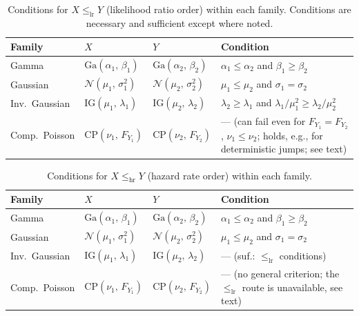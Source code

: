 \documentclass[11pt,a4paper]{article}
\theoremstyle{plain}
\theoremstyle{definition}
\theoremstyle{remark}
\begin{document}
\begin{table}[htbp]
\centering
\caption{Conditions for $X \le_{\mathrm{lr}} Y$ (likelihood ratio order) within each family.  Conditions are necessary and sufficient except where noted.}
\label{tab:ordering_lr}
\small
\begin{tabular}{@{}p{2.1cm}p{3.8cm}p{4.0cm}p{4.0cm}@{}}
\toprule
\textbf{Family} & $X$ & $Y$ & \textbf{Condition} \\
\midrule
Gamma
  & $\mathrm{Ga}(\alpha_1,\,\beta_1)$
  & $\mathrm{Ga}(\alpha_2,\,\beta_2)$
  & $\alpha_1 \le \alpha_2$ and $\beta_1 \ge \beta_2$ \\[4pt]
Gaussian
  & $\mathcal{N}(\mu_1,\,\sigma_1^2)$
  & $\mathcal{N}(\mu_2,\,\sigma_2^2)$
  & $\mu_1 \le \mu_2$ and $\sigma_1 = \sigma_2$ \\[4pt]
Inv.\ Gaussian
  & $\mathrm{IG}(\mu_1,\,\lambda_1)$
  & $\mathrm{IG}(\mu_2,\,\lambda_2)$
  & $\lambda_2 \ge \lambda_1$ and $\lambda_1/\mu_1^2 \ge \lambda_2/\mu_2^2$ \\[4pt]
Comp.\ Poisson
  & $\mathrm{CP}(\nu_1,\,F_{Y_1})$
  & $\mathrm{CP}(\nu_2,\,F_{Y_2})$
  & --- (can fail even for $F_{Y_1}{=}F_{Y_2}$, $\nu_1 \le \nu_2$; holds, e.g., for deterministic jumps; see text) \\
\bottomrule
\end{tabular}
\end{table}

\begin{table}[htbp]
\centering
\caption{Conditions for $X \le_{\mathrm{hr}} Y$ (hazard rate order) within each family.}
\label{tab:ordering_hr}
\small
\begin{tabular}{@{}p{2.1cm}p{3.8cm}p{4.0cm}p{4.0cm}@{}}
\toprule
\textbf{Family} & $X$ & $Y$ & \textbf{Condition} \\
\midrule
Gamma
  & $\mathrm{Ga}(\alpha_1,\,\beta_1)$
  & $\mathrm{Ga}(\alpha_2,\,\beta_2)$
  & $\alpha_1 \le \alpha_2$ and $\beta_1 \ge \beta_2$ \\[4pt]
Gaussian
  & $\mathcal{N}(\mu_1,\,\sigma_1^2)$
  & $\mathcal{N}(\mu_2,\,\sigma_2^2)$
  & $\mu_1 \le \mu_2$ and $\sigma_1 = \sigma_2$ \\[4pt]
Inv.\ Gaussian
  & $\mathrm{IG}(\mu_1,\,\lambda_1)$
  & $\mathrm{IG}(\mu_2,\,\lambda_2)$
  & --- (suf.: $\le_{\mathrm{lr}}$ conditions) \\[4pt]
Comp.\ Poisson
  & $\mathrm{CP}(\nu_1,\,F_{Y_1})$
  & $\mathrm{CP}(\nu_2,\,F_{Y_2})$
  & --- (no general criterion; the $\le_{\mathrm{lr}}$ route is unavailable, see text) \\
\bottomrule
\end{tabular}
\end{table}
\end{document}
